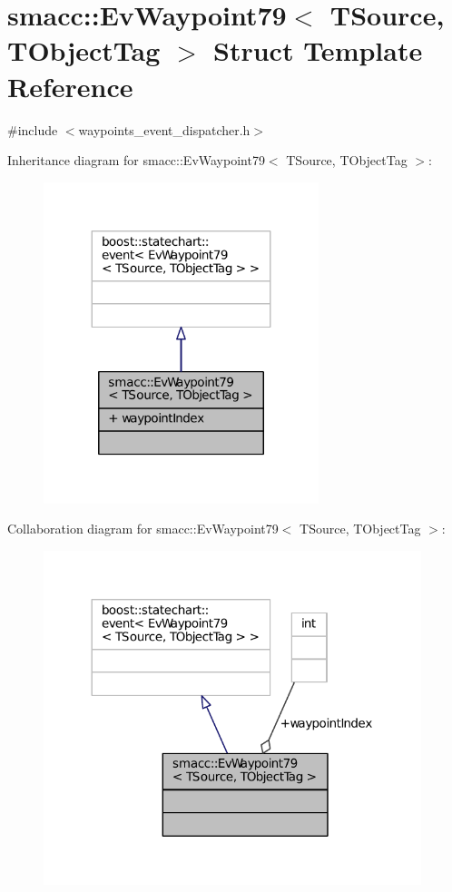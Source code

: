 \hypertarget{structsmacc_1_1EvWaypoint79}{}\section{smacc\+:\+:Ev\+Waypoint79$<$ T\+Source, T\+Object\+Tag $>$ Struct Template Reference}
\label{structsmacc_1_1EvWaypoint79}


{\ttfamily \#include $<$waypoints\+\_\+event\+\_\+dispatcher.\+h$>$}



Inheritance diagram for smacc\+:\+:Ev\+Waypoint79$<$ T\+Source, T\+Object\+Tag $>$\+:
\nopagebreak
\begin{figure}[H]
\begin{center}
\leavevmode
\includegraphics[width=227pt]{structsmacc_1_1EvWaypoint79__inherit__graph}
\end{center}
\end{figure}


Collaboration diagram for smacc\+:\+:Ev\+Waypoint79$<$ T\+Source, T\+Object\+Tag $>$\+:
\nopagebreak
\begin{figure}[H]
\begin{center}
\leavevmode
\includegraphics[width=312pt]{structsmacc_1_1EvWaypoint79__coll__graph}
\end{center}
\end{figure}
